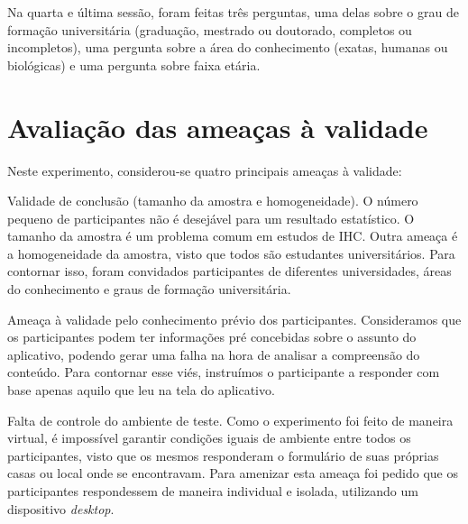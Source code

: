 \documentclass[12pt]{article}
\begin{document}
Na quarta e última sessão, foram feitas três perguntas, uma delas sobre o grau de formação universitária (graduação, mestrado ou doutorado, completos ou incompletos), uma pergunta sobre a área do conhecimento (exatas, humanas ou biológicas) e uma pergunta sobre faixa etária.

\section{Avaliação das ameaças à validade}

Neste experimento, considerou-se quatro principais ameaças à validade: 

Validade de conclusão (tamanho da amostra e homogeneidade). O número pequeno de participantes não é desejável para um resultado estatístico. O tamanho da amostra é um problema comum em estudos de IHC. Outra ameaça é a homogeneidade da amostra, visto que todos são estudantes universitários. Para contornar isso, foram convidados participantes de diferentes universidades, áreas do conhecimento e graus de formação universitária.

Ameaça à validade pelo conhecimento prévio dos participantes. Consideramos que os participantes podem ter informações pré concebidas sobre o assunto do aplicativo, podendo gerar uma falha na hora de analisar a compreensão do conteúdo. Para contornar esse viés, instruímos o participante a responder com base apenas aquilo que leu na tela do aplicativo.

Falta de controle do ambiente de teste. Como o experimento foi feito de maneira virtual, é impossível garantir condições iguais de ambiente entre todos os participantes, visto que os mesmos responderam o formulário de suas próprias casas ou local onde se encontravam. Para amenizar esta ameaça foi pedido que os participantes respondessem de maneira individual e isolada, utilizando um dispositivo \textit{desktop}.



\end{document}
